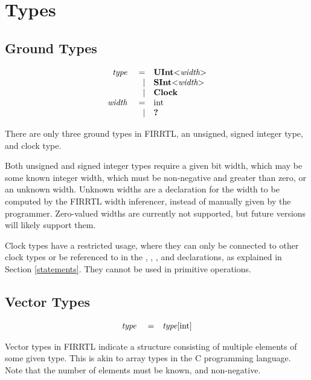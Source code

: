 \documentclass[12pt]{article}
\begin{document}
\section{Types}

\subsection{Ground Types}
\[
\begin{array}{rrl}
\text{\em type\ }       &=     &\text{\bf UInt}\text{\bf $<$} \text{\em width} \text{\bf $>$}      \\
                &\vert &\text{\bf SInt}\text{\bf $<$} \text{\em width} \text{\bf $>$}      \\
                &\vert &\text{\bf Clock} \\
\text{\em width\ }      &=     &\text{int}                       \\
                &\vert &\text{\bf ?\ }                      \\
\end{array}
\]

There are only three ground types in FIRRTL, an unsigned, signed integer type, and clock type.

Both unsigned and signed integer types require a given bit width, which may be some known integer width, which must be non-negative and greater than zero, or an unknown width.
Unknown widths are a declaration for the width to be computed by the FIRRTL width inferencer, instead of manually given by the programmer.
Zero-valued widths are currently not supported, but future versions will likely support them.

Clock types have a restricted usage, where they can only be connected to other clock types or be referenced to in the , , , and  declarations, as explained in Section \ref{statements}.
They cannot be used in primitive operations.

\subsection{Vector Types}
\[
\begin{array}{rrl}
\text{\em type\ }       &=     &\text{\em type}[\text{int}]           \\
\end{array}
\]

Vector types in FIRRTL indicate a structure consisting of multiple elements of some given type.
This is akin to array types in the C programming language.
Note that the number of elements must be known, and non-negative.
\end{document}
